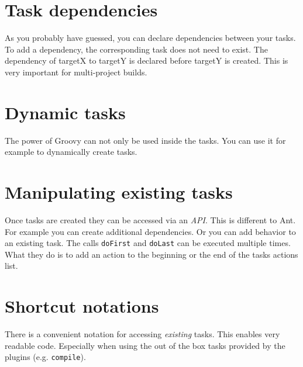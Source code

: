 \section{Task dependencies}
As you probably have guessed, you can declare dependencies between your tasks.
To add a dependency, the corresponding task does not need to exist. 
The dependency of targetX to targetY is declared before targetY is created. This is very important for multi-project builds.

\section{Dynamic tasks}
The power of Groovy can not only be used inside the tasks. You can use it for example to dynamically create tasks.

\section{Manipulating existing tasks}
Once tasks are created they can be accessed via an \emph{API}. This is different to Ant. For example you can create additional dependencies.
Or you can add behavior to an existing task.
The calls \texttt{doFirst} and \texttt{doLast} can be executed multiple times. What they do is to add an action to the beginning or the end of the tasks actions list.

\section{Shortcut notations}
There is a convenient notation for accessing \emph{existing} tasks.
This enables very readable code. Especially when using the out of the box tasks provided by the plugins (e.g. \texttt{compile}).

